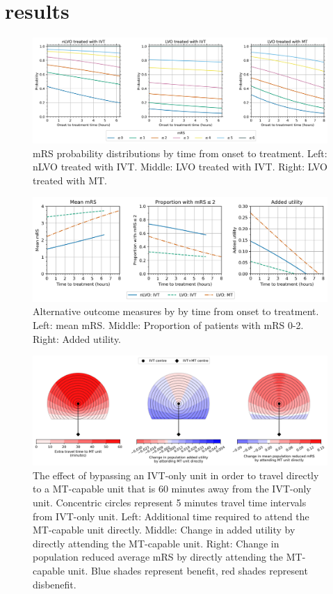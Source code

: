 \section{results}


\begin{figure}
\centering
\includegraphics[width=1.0\textwidth]{./images/probs_with_time}
\caption{mRS probability distributions by time from onset to treatment. Left: nLVO treated with IVT. Middle: LVO treated with IVT. Right: LVO treated with MT.}
\label{fig:probs_with_time}
\end{figure}


\begin{figure}
\centering
\includegraphics[width=1.0\textwidth]{./images/time_to_treatment}
\caption{Alternative outcome measures by by time from onset to treatment. Left: mean mRS. Middle: Proportion of patients with mRS 0-2. Right: Added utility.}
\label{fig:added_utility_six_in_one}
\end{figure}


\begin{figure}
\centering
\includegraphics[width=1.0\textwidth]{./images/circle_plots_t-IVT-to-MT=60_t-onset-to-ambo=60}
\caption{The effect of bypassing an IVT-only unit in order to travel directly to a MT-capable unit that is 60 minutes away from the IVT-only unit. Concentric circles represent 5 minutes travel time intervals from IVT-only unit. Left: Additional time required to attend the MT-capable unit  directly. Middle: Change in added utility by directly attending the MT-capable unit. Right: Change in population reduced average mRS by directly attending the MT-capable unit. Blue shades represent benefit, red shades represent disbenefit.}
\label{fig:added_utility_six_in_one}
\end{figure}

